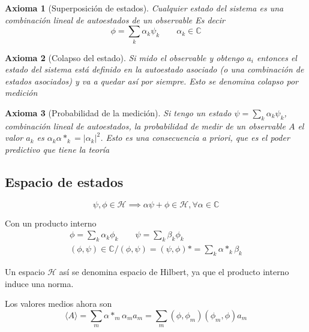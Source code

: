 \documentclass{book}
\numberwithin{equation}{section} %
\newtheorem{axiom}{Axioma}[chapter]
\begin{document}
\begin{axiom}[Superposición de estados]
    Cualquier estado del sistema es una combinación lineal de autoestados de un observable
    Es decir
    \begin{equation}
        \phi = \sum_k \alpha_k \psi_k \qquad \alpha_k \in \mathbb{C}
    \end{equation}
\end{axiom}

\begin{axiom}[Colapso del estado]
    Si mido el observable y obtengo $a_i$ entonces el estado del sistema está definido en la autoestado asociado (o una combinación de estados asociados) y va a quedar así por siempre.
    Esto se denomina colapso por medición
\end{axiom}

\begin{axiom}[Probabilidad de la medición]
    Si tengo un estado $\psi = \sum_k \alpha_k \psi_k$, combinación lineal de autoestados, la probabilidad de medir de un observable $A$ el valor $a_k$ es $\alpha_k \alpha*_k = |\alpha_k|^2$.
    Esto es una consecuencia \emph{a priori}, que es el poder predictivo que tiene la teoría
\end{axiom}

\subsection{Espacio de estados}

\begin{equation}
    \psi, \phi \in \mathcal{H} \implies \alpha \psi + \phi \in \mathcal{H}, \forall \alpha \in \mathbb{C}
\end{equation}

Con un producto interno
\begin{equation}
    \begin{gathered}
        \phi = \sum_k \alpha_k \phi_k \qquad \psi = \sum_k \beta_k \phi_k \\
        (\phi,\psi) \in \mathbb{C} / (\phi,\psi) = (\psi,\phi)* = \sum_k \alpha*_k \beta_k
    \end{gathered}
\end{equation}

Un espacio $\mathcal{H}$ así se denomina espacio de Hilbert, ya que el producto interno induce una norma.

Los valores medios ahora son
\begin{equation}
    \langle A \rangle = \sum_m \alpha*_m \alpha_m a_m = \sum_m (\phi, \phi_m) (\phi_m, \phi) a_m 
\end{equation}
\end{document}
